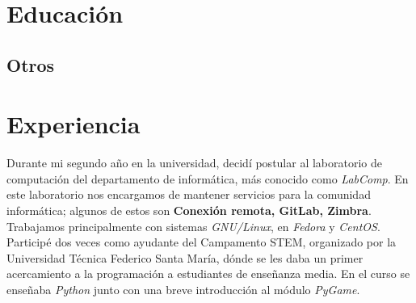 \documentclass[11pt,a4paper,sans]{moderncv}        %
\begin{document}
\makecvtitle

\section{Educación}
\subsection{Otros}


\section{Experiencia}
{
Durante mi segundo año en la universidad, decidí postular al laboratorio de computación del departamento de informática, más conocido como \emph{LabComp}. En este laboratorio nos encargamos de mantener servicios para la comunidad informática; algunos de estos son \textbf{Conexión remota, GitLab, Zimbra}. Trabajamos principalmente con sistemas \emph{GNU/Linux}, en \emph{Fedora} y \emph{CentOS}.
}%
%
{
Participé dos veces como ayudante del Campamento STEM, organizado por la Universidad Técnica Federico Santa María, dónde se les daba un primer acercamiento a la programación a estudiantes de enseñanza media. En el curso se enseñaba \emph{Python} junto con una breve introducción al módulo \emph{PyGame}.
}
\end{document}
